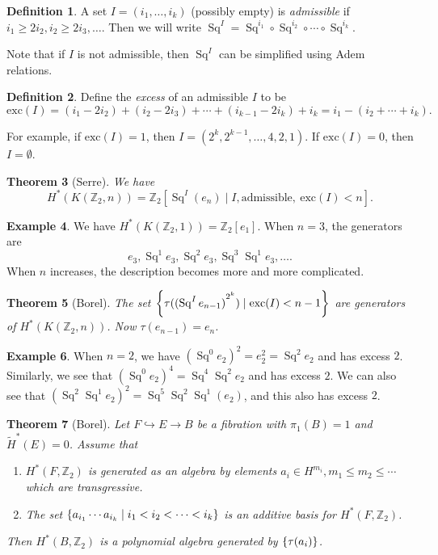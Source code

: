 \documentclass[leqno, openany]{memoir}
\newtheorem{thm}{Theorem}[section]
\theoremstyle{definition}
\newtheorem{defn}[thm]{Definition}
\newtheorem{exm}[thm]{Example}
\theoremstyle{remark}
\theoremstyle{plain}
\theoremstyle{definition}
\theoremstyle{remark}
\newcommand{\Z}{\mathbb{Z}}
\newcommand{\mr}[1]{\mathrm{#1}}
\newcommand{\wt}[1]{\widetilde{#1}}
\DeclareMathOperator{\Sq}{Sq}
\begin{document}
\begin{defn} A set $I = (i_1, \ldots, i_k)$ (possibly empty) is
\textit{admissible} if $i_1 \geq 2 i_2, i_2 \geq 2 i_3, \ldots$. Then we will
write $\Sq^I = \Sq^{i_1} \circ \Sq^{i_2} \circ \cdots \circ \Sq^{i_k}$.
\end{defn}

Note that if $I$ is not admissible, then $\Sq^I$ can be simplified using Adem
relations.

\begin{defn} Define the \textit{excess} of an admissible $I$ to be \[
\mr{exc}(I) = (i_1 - 2 i_2) + (i_2 - 2 i_3) + \cdots + (i_{k-1} - 2 i_k) + i_k
= i_1 - (i_2 + \cdots + i_k). \] \end{defn}

For example, if $\mr{exc}(I) = 1$, then $I = (2^k, 2^{k-1}, \ldots, 4, 2, 1)$.
If $\mr{exc}(I) = 0$, then $I = \emptyset$.

\begin{thm}[Serre] We have \[ H^*(K( \Z_2, n )) = \Z_2 [\Sq^I (e_n) \mid I,
\text{admissible},\ \mr{exc}(I) < n]. \] \end{thm}

\begin{exm} We have $H^*(K(\Z_2, 1)) = \Z_2[e_1]$. When $n=3$, the generators
    are \[ e_3, \Sq^1 e_3, \Sq^2 e_3, \Sq^3 \Sq^1 e_3, \ldots. \] When $n$
increases, the description becomes more and more complicated.  \end{exm}

\begin{thm}[Borel] The set $\qty{\tau({(\Sq^I e_{n-1})}^{2^k}) \mid \mr{exc}(I)
< n-1}$ are generators of $H^*(K(\Z_2, n))$. Now $\tau(e_{n-1}) = e_n$.
\end{thm}

\begin{exm} When $n = 2$, we have ${( \Sq^0 e_2 )}^2 = e_2^2 = \Sq^2 e_2$ and
    has excess $2$. Similarly, we see that ${(\Sq^0 e_2)}^4 = \Sq^4 \Sq^2 e_2$
    and has excess $2$. We can also see that ${(\Sq^2 \Sq^1 e_2)}^2 = \Sq^5
    \Sq^2 \Sq^1 (e_2)$, and this also has excess $2$.  \end{exm}

\begin{thm}[Borel] Let $F \hookrightarrow E \to B$ be a fibration with
    $\pi_1(B) = 1$ and $\wt{H}^*(E) = 0$. Assume that \begin{enumerate} \item
        $H^*(F, \Z_2)$ is generated as an algebra by elements $a_i \in H^{m_i},
        m_1 \leq m_2 \leq \cdots$ which are transgressive.  \item The set
$\qty{a_{i_1} \cdots a_{i_k} \mid i_1 < i_2 < \cdots < i_k}$ is an additive
basis for $H^*(F, \Z_2)$.  \end{enumerate} Then $H^*(B, \Z_2)$ is a polynomial
algebra generated by $\qty{\tau (a_i)}$.  \end{thm}
\end{document}
